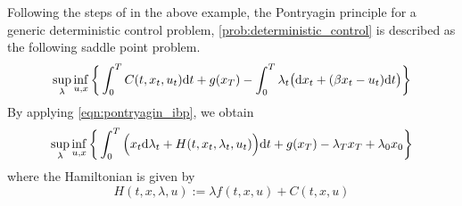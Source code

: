 \documentclass[11pt]{book}
\newcommand{\dd}{\text{\normalfont d}}
\newcommand{\dt}{\text{\normalfont d}t}
\newcommand{\dx}{\text{\normalfont d}x}
\begin{document}
Following the steps of in the above example, the Pontryagin principle for a generic deterministic control problem, \ref{prob:deterministic_control} is described as the following saddle point problem.
\begin{equation}\label{eqn:sup_inf}
    \sup_{\lambda}\inf_{u,x}\bigg\{\int_0^TC(t,x_t,u_t) {\dt} +g(x_T) - \int_0^T \lambda_t \big({\dx}_t + (\beta x_t  - u_t ){\dt}\big)\bigg\}
\end{equation}
By applying \eqref{eqn:pontryagin_ibp}, we obtain 
\begin{equation}
    \sup_{\lambda}\inf_{u,x}\bigg\{\int_0^T\Big(x_t {\dd}\lambda_t+ H(t,x_t,\lambda_t,u_t)\Big) {\dt} +g(x_T) - \lambda_T x_T + \lambda_0 x_0\bigg\}
\end{equation}
where the Hamiltonian is given by 
\begin{equation}
    H(t,x,\lambda,u):=\lambda f(t,x,u)+ C(t,x,u)
\end{equation} 
\end{document}
